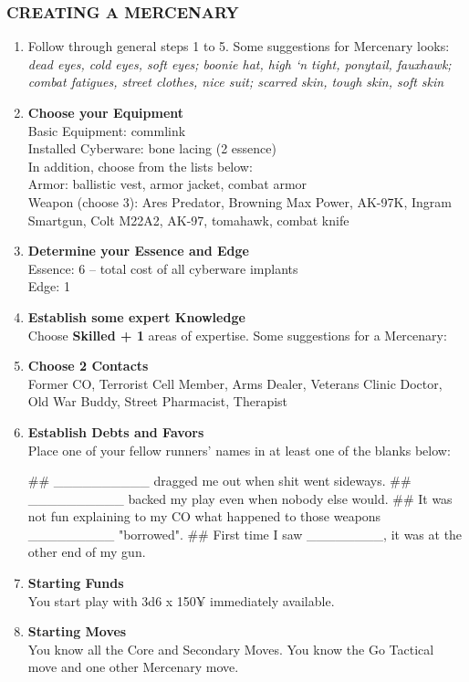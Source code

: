 \subsubsection{CREATING A MERCENARY}
\begin{enumerate}
    \item Follow through general steps 1 to 5. Some suggestions for Mercenary looks: \textit{dead eyes, cold eyes, soft eyes; boonie hat, high ‘n tight, ponytail, fauxhawk; combat fatigues, street clothes, nice suit; scarred skin, tough skin, soft skin}
    
    \item \textbf{Choose your Equipment} \\
    Basic Equipment: commlink \\
    Installed Cyberware: bone lacing (2 essence) \\
    In addition, choose from the lists below: \\
    Armor: ballistic vest, armor jacket, combat armor \\
    Weapon (choose 3): Ares Predator, Browning Max Power, AK-97K, Ingram Smartgun, Colt M22A2, AK-97, tomahawk, combat knife
    
    \item \textbf{Determine your Essence and Edge} \\
    Essence: 6 – total cost of all cyberware implants \\ 
    Edge: 1

    \item \textbf{Establish some expert Knowledge} \\
    Choose \textbf{\textsf{Skilled + 1}} areas of expertise. Some suggestions for a Mercenary: \textit{}
    
    \item \textbf{Choose 2 Contacts} \\
    Former CO, Terrorist Cell Member, Arms Dealer, Veterans Clinic Doctor, Old War Buddy, Street Pharmacist, Therapist
    
    \item \textbf{Establish Debts and Favors} \\
    Place one of your fellow runners’ names in at least one of the blanks below:
        \begin{easylist}
            ## \_\_\_\_\_\_\_\_\_\_ dragged me out when shit went sideways.
            ## \_\_\_\_\_\_\_\_\_\_ backed my play even when nobody else would.
            ## It was not fun explaining to my CO what happened to those weapons \_\_\_\_\_\_\_\_\_ "borrowed".
            ## First time I saw \_\_\_\_\_\_\_\_, it was at the other end of my gun.
        \end{easylist}
    
    \item \textbf{Starting Funds} \\
    You start play with 3d6 x 150¥ immediately available.
    
    \item \textbf{Starting Moves} \\
    You know all the Core and Secondary Moves. You know the Go Tactical move and one other Mercenary move.
\end{enumerate}

